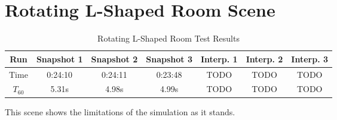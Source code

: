 \section{Rotating L-Shaped Room Scene}

\begin{table}[t!]\label{tbl:LScene}
\centering
    \begin{tabular}{| c | c | c | c | c | c | c |}
        \hline
        Run & Snapshot 1 & Snapshot 2 & Snapshot 3 & Interp. 1 & Interp. 2 & Interp. 3 \\
        \hline
        Time & 0:24:10 & 0:24:11 & 0:23:48 & TODO & TODO & TODO \\
        \hline
        \(T_{60}\) & 5.31s & 4.98s & 4.99s & TODO & TODO & TODO \\
        \hline
    \end{tabular}
    \caption{Rotating L-Shaped Room Test Results}
\end{table}

This scene shows the limitations of the simulation as it stands.
